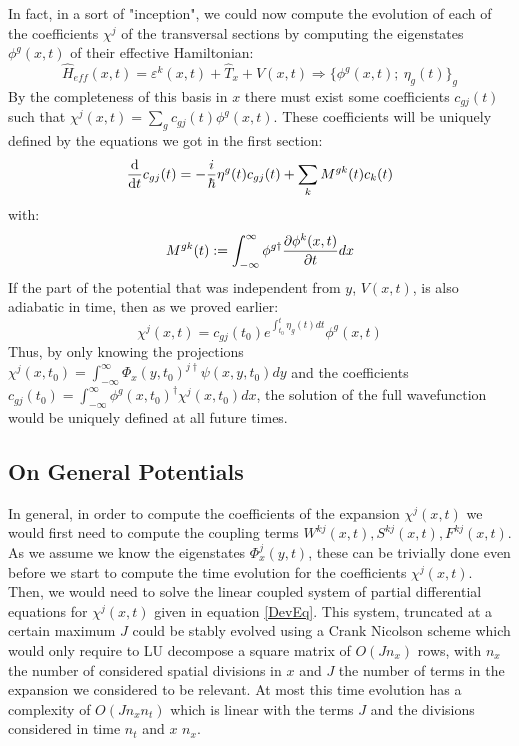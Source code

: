 \documentclass[11pt, a4paper]{article} %
\begin{document}
In fact, in a sort of "inception", we could now compute the evolution of each of the coefficients $\chi^j$ of the transversal sections by computing the eigenstates $\phi^g(x,t)$ of their effective Hamiltonian:
\begin{equation}
\hat{H}_{eff}(x,t)= \varepsilon^k(x,t) + \hat{T}_x+V(x,t) \Rightarrow \{\phi^g(x,t);\ \eta_g(t)\}_g
\end{equation}
By the completeness of this basis in $x$ there must exist some coefficients $c_{gj}(t)$ such that $\chi^j(x,t)=\sum_g c_{gj}(t) \phi^g(x,t)$. These coefficients will be uniquely defined by the equations we got in the first section:
\begin{equation} 
\dv{}{t}c_{gj}(t)=-\frac{i}{\hbar}\eta^g(t) c_{gj}(t) + \sum_k M^{gk}(t)c_k(t)
\end{equation}
with:
\begin{equation}
M^{gk}(t):=\int_{-\infty}^\infty\phi^{g \dagger} \pdv{\phi^k(x,t)}{t} dx
\end{equation}
If the part of the potential that was independent from $y$, $V(x,t)$, is also adiabatic in time, then as we proved earlier:
\begin{equation}
\chi^j(x,t)=c_{gj}(t_0)e^{\int_{t_0}^t \eta_g(t) dt} \phi^g(x,t)
\end{equation}
Thus, by only knowing the projections $\chi^j(x,t_0)=\int_{-\infty}^{\infty}\Phi_x(y,t_0)^{j\dagger} \psi(x,y,t_0)dy$ and the coefficients $c_{gj}(t_0)=\int_{-\infty}^{\infty}\phi^g(x,t_0)^\dagger \chi^j(x,t_0)dx$, the solution of the full wavefunction would be uniquely defined at all future times.

\subsection{On General Potentials}
In general, in order to compute the coefficients of the expansion $\chi^j(x,t)$ we would first need to compute the coupling terms $W^{kj}(x,t),S^{kj}(x,t),F^{kj}(x,t)$. As we assume we know the eigenstates $\Phi^j_x(y,t)$, these can be trivially done even before we start to compute the time evolution for the coefficients $\chi^j(x,t)$. Then, we would need to solve the linear coupled system of partial differential equations for $\chi^j(x,t)$ given in equation \eqref{DevEq}. This system, truncated at a certain maximum $J$ could be stably evolved using a Crank Nicolson scheme which would only require to LU decompose a square matrix of $O(Jn_{x})$ rows, with $n_x$ the number of considered spatial divisions in $x$ and $J$ the number of terms in the expansion we considered to be relevant. At most this time evolution has a complexity of $O(Jn_xn_t)$ which is linear with the terms $J$ and the divisions considered in time $n_t$ and $x$ $n_x$.
\end{document}
